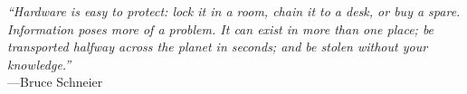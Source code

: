 %
\begin{frontmatter}

%
%
\makefrontmatter

%
%
%
%
%
%


%
%



%
%
\begin{epigraph} %
  \emph{“Hardware is easy to protect: lock it in a room, chain it to a desk, or
  buy a spare. Information poses more of a problem. It can exist in more than
  one place; be transported halfway across the planet in seconds; and be stolen
  without your knowledge.”}\\
  ---Bruce Schneier
\end{epigraph}

%



\end{frontmatter}
